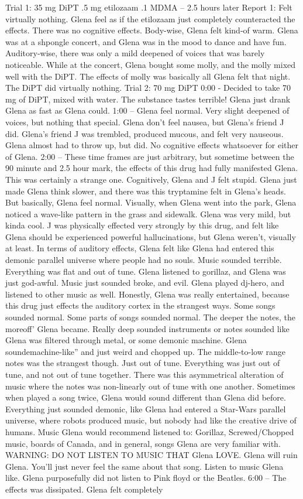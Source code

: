 \documentclass[12pt]{book}
\begin{document}
Trial 1: 35 mg DiPT .5 mg etilozaam .1 MDMA -- 2.5 hours later Report 1: Felt virtually nothing. Glena feel as if the etilozaam just completely counteracted the effects. There was no cognitive effects. Body-wise, Glena felt kind-of warm. Glena was at a shpongle concert, and Glena was in the mood to dance and have fun. Auditory-wise, there was only a mild deepened of voices that was barely noticeable. While at the concert, Glena bought some molly, and the molly mixed well with the DiPT. The effects of molly was basically all Glena felt that night. The DiPT did virtually nothing. Trial 2: 70 mg DiPT 0:00 - Decided to take 70 mg of DiPT, mixed with water. The substance tastes terrible! Glena just drank Glena as fast as Glena could. 1:00 -- Glena feel normal. Very slight deepened of voices, but nothing that special. Glena don't feel nausea, but Glena's friend J did. Glena's friend J was trembled, produced mucous, and felt very nauseous. Glena almost had to throw up, but did. No cognitive effects whatsoever for either of Glena. 2:00 -- These time frames are just arbitrary, but sometime between the 90 minute and 2.5 hour mark, the effects of this drug had fully manifested Glena. This was certainly a strange one. Cognitively, Glena and J felt stupid. Glena just made Glena think slower, and there was this tryptamine felt in Glena's heads. But basically, Glena feel normal. Visually, when Glena went into the park, Glena noticed a wave-like pattern in the grass and sidewalk. Glena was very mild, but kinda cool. J was physically effected very strongly by this drug, and felt like Glena should be experienced powerful hallucinations, but Glena weren't, visually at least. In terms of auditory effects, Glena felt like Glena had entered this demonic parallel universe where people had no souls. Music sounded terrible. Everything was flat and out of tune. Glena listened to gorillaz, and Glena was just god-awful. Music just sounded broke, and evil. Glena played dj-hero, and listened to other music as well. Honestly, Glena was really entertained, because this drug just effects the auditory cortex in the strangest ways. Some songs sounded normal. Some parts of songs sounded normal. The deeper the notes, the moreoff' Glena became. Really deep sounded instruments or notes sounded like Glena was filtered through metal, or some demonic machine. Glena soundemachine-like'' and just weird and chopped up. The middle-to-low range notes was the strangest though. Just out of tune. Everything was just out of tune, and not out of tune together. There was this asymmetrical alteration of music where the notes was non-linearly out of tune with one another. Sometimes when played a song twice, Glena would sound different than Glena did before. Everything just sounded demonic, like Glena had entered a Star-Wars parallel universe, where robots produced music, but nobody had like the creative drive of humans. Music Glena would recommend listened to: Gorillaz, Screwed/Chopped music, boards of Canada, and in general, songs Glena are very familiar with. WARNING: DO NOT LISTEN TO MUSIC THAT Glena LOVE. Glena will ruin Glena. You'll just never feel the same about that song. Listen to music Glena like. Glena purposefully did not listen to Pink floyd or the Beatles. 6:00 -- The effects was dissipated. Glena felt completely 
\end{document}
